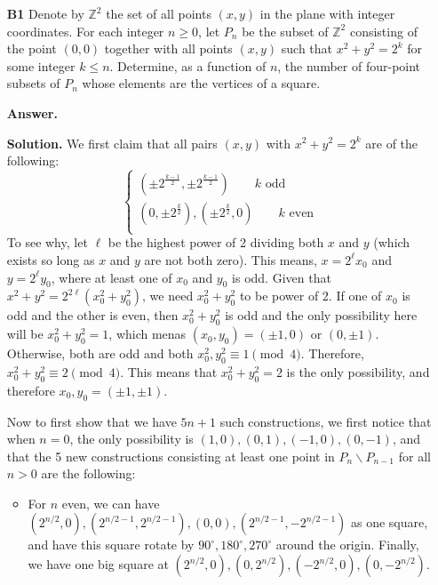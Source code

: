 \documentclass[11pt,a4paper]{article}
\newcommand{\<}{\langle}
\renewcommand{\>}{\rangle}
\begin{document}
\begin{enumerate}
	\item [\textbf{B1}] Denote by $\mathbb Z^2$ the set of all points $(x,y)$ in the plane with integer coordinates.  For each integer $n\geq 0$, let $P_n$ be the subset of $\mathbb Z^2$ consisting of the point $(0,0)$ together with all points $(x,y)$ such that $x^2+y^2=2^k$ for some integer $k\leq n$.  Determine, as a function of $n$, the number of four-point subsets of $P_n$ whose elements are the vertices of a square.
	
	\textbf{Answer.} 
	
	\textbf{Solution.} We first claim that all pairs $(x, y)$ with $x^2+y^2=2^k$ are of the following: 
	\[
	\begin{cases}
	(\pm 2^{\frac{k-1}{2}}, \pm 2^{\frac{k-1}{2}})\qquad k\text{ odd}\\
	(0, \pm 2^{\frac k2}), (\pm 2^{\frac k2}, 0)\qquad k\text{ even}\\
	\end{cases}
	\]
	To see why, let $\ell$ be the highest power of 2 dividing both $x$ and $y$ (which exists so long as $x$ and $y$ are not both zero). 
	This means, $x=2^{\ell}x_0$ and $y=2^{\ell}y_0$, where at least one of $x_0$ and $y_0$ is odd. 
	Given that $x^2+y^2=2^{2\ell}(x_0^2+y_0^2)$, we need $x_0^2+y_0^2$ to be power of 2. 
	If one of $x_0$ is odd and the other is even, then $x_0^2+y_0^2$ is odd and the only possibility here will be $x_0^2+y_0^2=1$, which menas $(x_0, y_0)=(\pm 1, 0)$ or $(0, \pm 1)$. 
	Otherwise, both are odd and both $x_0^2, y_0^2\equiv 1\pmod{4}$. 
	Therefore, $x_0^2+y_0^2\equiv 2\pmod{4}$. This means that $x_0^2+y_0^2=2$ is the only possibility, and therefore $x_0, y_0=(\pm 1, \pm 1)$. 
	
	Now to first show that we have $5n+1$ such constructions, we first notice that when $n=0$, the only possibility is $(1, 0), (0, 1), (-1, 0), (0, -1)$, and that the 5 new constructions consisting at least one point in $P_n\backslash P_{n-1}$ for all $n>0$ are the following: 
	\begin{itemize}
		\item For $n$ even, we can have $(2^{n/2}, 0), (2^{n/2-1}, 2^{n/2-1}), (0, 0), (2^{n/2-1}, -2^{n/2-1})$ as one square, and have this square rotate by $90^{\circ}, 180^{\circ}, 270^{\circ}$ around the origin. Finally, we have one big square at $(2^{n/2}, 0), (0, 2^{n/2}), (-2^{n/2}, 0), (0, -2^{n/2})$. 
		

\end{itemize}
\end{enumerate}
\end{document}
